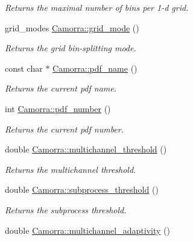 \begin{DoxyCompactItemize}
\begin{DoxyCompactList}\small\item\em Returns the maximal number of bins per 1-\/d grid. \end{DoxyCompactList}\item 
\hypertarget{a00798_a73aef909f3351e47a5947caaaa248c96}{
grid\_\-modes \hyperlink{a00798_a73aef909f3351e47a5947caaaa248c96}{Camorra::grid\_\-mode} ()}
\label{a00798_a73aef909f3351e47a5947caaaa248c96}

\begin{DoxyCompactList}\small\item\em Returns the grid bin-\/splitting mode. \end{DoxyCompactList}\item 
\hypertarget{a00798_a2f7c6820df8813be79a94788715db133}{
const char $\ast$ \hyperlink{a00798_a2f7c6820df8813be79a94788715db133}{Camorra::pdf\_\-name} ()}
\label{a00798_a2f7c6820df8813be79a94788715db133}

\begin{DoxyCompactList}\small\item\em Returns the current pdf name. \end{DoxyCompactList}\item 
\hypertarget{a00798_a50db3e81e876becba1a5a0c20cef098e}{
int \hyperlink{a00798_a50db3e81e876becba1a5a0c20cef098e}{Camorra::pdf\_\-number} ()}
\label{a00798_a50db3e81e876becba1a5a0c20cef098e}

\begin{DoxyCompactList}\small\item\em Returns the current pdf number. \end{DoxyCompactList}\item 
\hypertarget{a00798_ac61ace3ceae1851c72e6e97d16cfdeb9}{
double \hyperlink{a00798_ac61ace3ceae1851c72e6e97d16cfdeb9}{Camorra::multichannel\_\-threshold} ()}
\label{a00798_ac61ace3ceae1851c72e6e97d16cfdeb9}

\begin{DoxyCompactList}\small\item\em Returns the multichannel threshold. \end{DoxyCompactList}\item 
\hypertarget{a00798_af1e467f7e98b5a4ec87e321916e43712}{
double \hyperlink{a00798_af1e467f7e98b5a4ec87e321916e43712}{Camorra::subprocess\_\-threshold} ()}
\label{a00798_af1e467f7e98b5a4ec87e321916e43712}

\begin{DoxyCompactList}\small\item\em Returns the subprocess threshold. \end{DoxyCompactList}\item 
\hypertarget{a00798_a8a3cd9f4acc73ceff9a10603cf104557}{
double \hyperlink{a00798_a8a3cd9f4acc73ceff9a10603cf104557}{Camorra::multichannel\_\-adaptivity} ()}
\label{a00798_a8a3cd9f4acc73ceff9a10603cf104557}


\end{DoxyCompactItemize}
